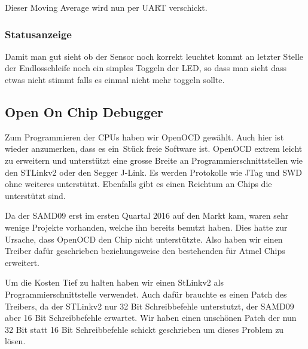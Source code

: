 Dieser Moving Average wird nun per UART verschickt.

\subsubsection{Statusanzeige}
\label{subs:Statusanzeige}

Damit man gut sieht ob der Sensor noch korrekt leuchtet kommt an letzter Stelle der Endlosschleife noch ein simples Toggeln der LED, so dass man sieht dass etwas nicht stimmt falls es einmal nicht mehr toggeln sollte.

\subsection{Open On Chip Debugger}

Zum Programmieren der CPUs haben wir OpenOCD gew\"ahlt. Auch hier ist wieder anzumerken, dass es ein St\"uck freie Software ist.
OpenOCD extrem leicht zu erweitern und unterst\"utzt eine grosse Breite an Programmierschnittstellen wie den STLinkv2 oder den Segger J-Link. Es werden Protokolle wie JTag und SWD ohne weiteres unterst\"utzt.
Ebenfalls gibt es einen Reichtum an Chips die unterst\"utzt sind.

Da der SAMD09 erst im ersten Quartal 2016 auf den Markt kam, waren sehr wenige Projekte vorhanden, welche ihn bereits benutzt haben. Dies hatte zur Ursache, dass OpenOCD den Chip nicht unterst\"utzte. Also haben wir einen Treiber daf\"ur geschrieben beziehungsweise den bestehenden f\"ur Atmel Chips erweitert.

Um die Kosten Tief zu halten haben wir einen StLinkv2 als Programmierschnittstelle verwendet. Auch daf\"ur brauchte es einen Patch des Treibers, da der STLinkv2 nur 32 Bit Schreibbefehle unterstutzt, der SAMD09 aber 16 Bit Schreibbefehle erwartet. Wir haben einen unsch\"onen Patch der nun 32 Bit statt 16 Bit Schreibbefehle schickt geschrieben um dieses Problem zu l\"osen.
